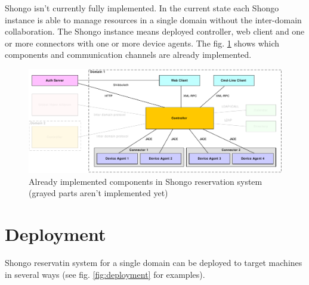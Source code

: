 Shongo isn't currently fully implemented. In the current state each Shongo instance is able to manage resources in a single domain without the inter-domain collaboration. The Shongo instance means deployed controller, web client and one or more connectors with one or more device agents. The fig. \ref{fig:architecture-implemented} shows which components and communication channels are already implemented.

\begin{figure}[ht!]
\includegraphics[width=\textwidth]{diagrams/dd_architecture_implemented}
\caption{Already implemented components in Shongo reservation system (grayed parts aren't implemented yet)}
\label{fig:architecture-implemented}
\end{figure}




\chapter{Deployment}

Shongo reservatin system for a single domain can be deployed to target machines in several ways (see fig. \ref{fig:deployment} for examples).

